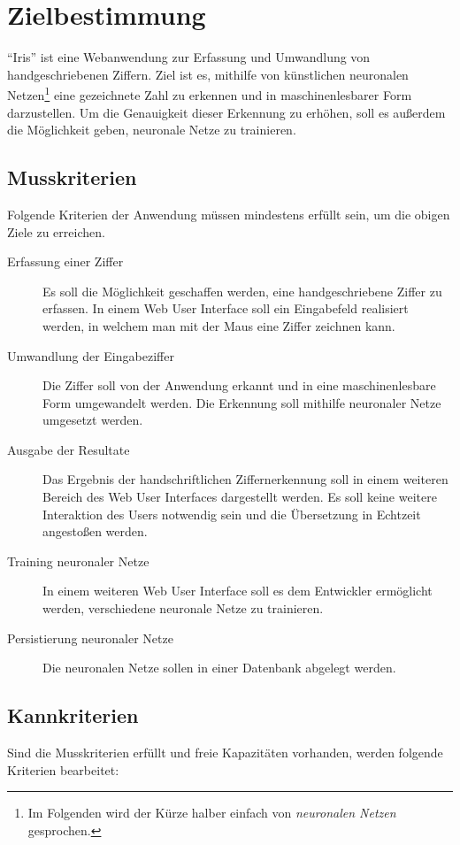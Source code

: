 \section{Zielbestimmung}
``Iris'' ist eine Webanwendung zur Erfassung und Umwandlung von handgeschriebenen Ziffern. Ziel ist es, mithilfe von künstlichen neuronalen Netzen\footnote{Im Folgenden wird der Kürze halber einfach von \emph{neuronalen Netzen} gesprochen.} eine gezeichnete Zahl zu erkennen und in maschinenlesbarer Form darzustellen.
Um die Genauigkeit dieser Erkennung zu erhöhen, soll es außerdem die Möglichkeit geben, neuronale Netze zu trainieren.
 
\subsection{Musskriterien}

Folgende Kriterien der Anwendung müssen mindestens erfüllt sein, um die obigen Ziele zu erreichen.

\begin{description}
\item [Erfassung einer Ziffer]
Es soll die Möglichkeit geschaffen werden, eine handgeschriebene Ziffer zu erfassen. In einem Web User Interface soll ein Eingabefeld realisiert werden, in welchem man mit der Maus eine Ziffer zeichnen kann.
\item [Umwandlung der Eingabeziffer]
Die Ziffer soll von der Anwendung erkannt und in eine maschinenlesbare Form umgewandelt werden. Die Erkennung soll mithilfe neuronaler Netze umgesetzt werden.
\item [Ausgabe der Resultate]
Das Ergebnis der handschriftlichen Ziffernerkennung soll in einem weiteren Bereich des Web User Interfaces dargestellt werden. Es soll keine weitere Interaktion des Users notwendig sein und die Übersetzung in Echtzeit angestoßen werden.
\item [Training neuronaler Netze]
In einem weiteren Web User Interface soll es dem Entwickler ermöglicht werden, verschiedene neuronale Netze zu trainieren.
\item [Persistierung neuronaler Netze]
Die neuronalen Netze sollen in einer Datenbank abgelegt werden.
\end{description}
 
\subsection{Kannkriterien}

Sind die Musskriterien erfüllt und freie Kapazitäten vorhanden, werden folgende Kriterien bearbeitet:

